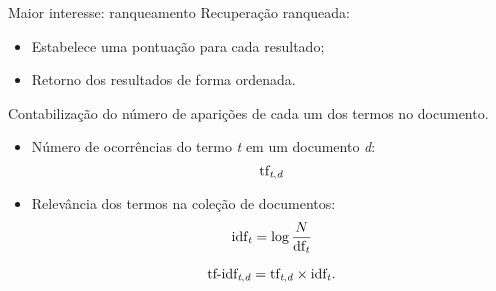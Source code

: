 \documentclass[%
  10pt,%
  aspectratio = 169,%
  compress,%
  t,%
]{beamer}%
\begin{document}

    \begin{frame}[fragile = singleslide]{}{Maior interesse: ranqueamento}
        Recuperação ranqueada:
        \begin{itemize}
            \item Estabelece uma pontuação para cada resultado;
            \item Retorno dos resultados de forma ordenada.
        \end{itemize}

        Contabilização do número de aparições de cada um dos termos no documento.
        \begin{itemize}
            \item Número de ocorrências do termo \textit{t} em um documento \textit{d}:
            \begin{equation}\label{eq:tf-td}
                \text{tf}_{\text{\textit{t},\textit{d}}}
            \end{equation}
            \item Relevância dos termos na coleção de documentos:
            \begin{equation}
                \label{eq:inverse-document-frequency}
                \text{idf}_{\text{\textit{t}}} = \log{\frac{N}{\text{df}_{\text{\textit{t}}}}}
            \end{equation}

            \begin{equation}
                \label{eq:tf-idf}
                \text{tf-idf}_{\text{\textit{t},\textit{d}}}  = \text{tf}_{\text{\textit{t},\textit{d}}} \times \text{idf}_{\text{\textit{t}}}.
            \end{equation}
        \end{itemize}

    \end{frame}

\end{document}
